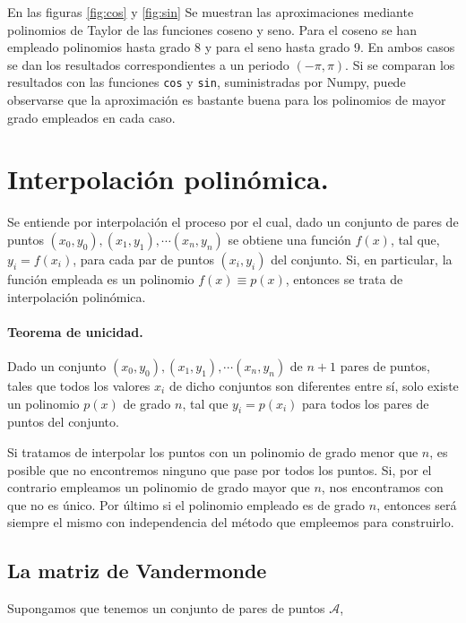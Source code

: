 \begin{paracol}{2}
En las figuras \ref{fig:cos} y \ref{fig:sin} Se muestran las aproximaciones mediante polinomios de Taylor de las funciones coseno y seno. Para el coseno se han empleado polinomios hasta grado 8 y para el seno hasta grado 9. En ambos casos se dan los resultados correspondientes a un periodo $(-\pi, \pi)$. Si se comparan los resultados con las funciones \texttt{cos} y \texttt{sin}, suministradas por Numpy, puede observarse que la aproximación es bastante buena para los polinomios de mayor grado empleados en cada caso.

\section{Interpolación polinómica.}

Se entiende por interpolación el proceso por el cual, dado un conjunto de pares de puntos $(x_0,y_0),(x_1,y_1),\cdots (x_n,y_n)$ se obtiene una función $f(x)$, tal que, $y_i=f(x_i)$, para cada par de puntos $(x_i,y_i)$ del conjunto. Si, en particular, la función empleada es un polinomio $f(x)\equiv p(x)$, entonces se trata de interpolación polinómica. 

\paragraph{Teorema de unicidad.} Dado un conjunto   $(x_0,y_0),(x_1,y_1),\cdots (x_n,y_n)$ de $n+1$ pares de puntos, tales que todos los valores $x_i$ de dicho conjuntos son diferentes entre sí, solo existe un polinomio $p(x)$ de grado $n$, tal que $y_i=p(x_i)$ para todos los pares de puntos del conjunto.

Si tratamos de interpolar los puntos con un polinomio de grado menor que $n$, es posible que no encontremos ninguno que pase por todos los puntos. Si, por el contrario empleamos un polinomio de grado mayor que $n$, nos encontramos con que no es único. Por último si el polinomio empleado es de grado $n$, entonces será siempre el mismo con independencia del método que empleemos para construirlo.

\subsection{La matriz de Vandermonde} 
Supongamos que tenemos un conjunto de pares de puntos $\mathcal{A}$, 


\end{paracol}
